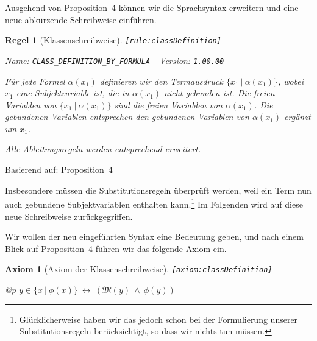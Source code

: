 \documentclass[a4paper,german,10pt,twoside]{book}
\newtheorem{ax}{Axiom}
\newtheorem{rul}{Regel}
\theoremstyle{definition}
\theoremstyle{remark}
\begin{document}
\par
Ausgehend von \hyperlink{theorem:comprehension}{Proposition~4} k{\"o}nnen wir die Sprachsyntax erweitern und eine neue abk{\"u}rzende Schreibweise einf{\"u}hren.

\begin{rul}[Klassenschreibweise]
\label{rule:classDefinition} \hypertarget{rule:classDefinition}{}
{\tt \tiny [\verb]rule:classDefinition]]}

\par
{\em   Name: \verb]CLASS_DEFINITION_BY_FORMULA]  -  Version: \verb]1.00.00]}


F{\"u}r jede Formel $\alpha(x_1)$ definieren wir den Termausdruck $\{ x_1 \ | \ \alpha(x_1)\}$, wobei $x_1$ eine Subjektvariable ist, die in $\alpha(x_1)$ nicht gebunden ist. Die freien Variablen von $\{ x_1 \ | \ \alpha(x_1)\}$ sind die freien Variablen von $\alpha(x_1)$. Die gebundenen Variablen entsprechen den gebundenen Variablen von $\alpha(x_1)$ erg{\"a}nzt um $x_1$.

\par
Alle Ableitungsregeln werden entsprechend erweitert.
\end{rul}
Basierend auf: 
 \hyperlink{theorem:comprehension}{Proposition~4}

Insbesondere m{\"u}ssen die Substitutionsregeln {\"u}berpr{\"u}ft werden, weil ein Term nun auch gebundene Subjektvariablen enthalten kann.\footnote{Gl{\"u}cklicherweise haben wir das jedoch schon bei der Formulierung unserer Substitutionsregeln ber{\"u}cksichtigt, so dass wir nichts tun m{\"u}ssen.}
Im Folgenden wird auf diese neue Schreibweise zur{\"u}ckgegriffen.


\par
Wir wollen der neu eingef{\"u}hrten Syntax eine Bedeutung geben, und nach einem Blick auf \hyperlink{theorem:comprehension}{Proposition~4} f{\"u}hren wir das folgende Axiom ein.

\begin{ax}[Axiom der Klassenschreibweise]
\label{axiom:classDefinition} \hypertarget{axiom:classDefinition}{}
{\tt \tiny [\verb]axiom:classDefinition]]}
\mbox{}
\begin{longtable}{{@{\extracolsep{\fill}}p{\linewidth}}}
\centering $y \in \{ x \ | \ \phi(x) \} \ \leftrightarrow\ (\mathfrak{M}(y)\ \land\ \phi(y))$
\end{longtable}

\end{ax}
\end{document}
